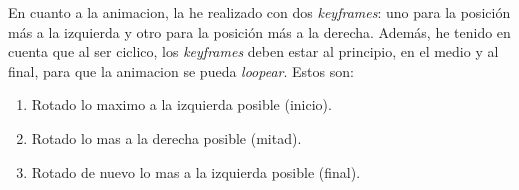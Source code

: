 \documentclass{article}
\begin{document}
En cuanto a la animacion, la he realizado con dos \textit{keyframes}: uno para la posición más a la izquierda y otro para la posición más a la derecha. Además, he tenido en cuenta que al ser ciclico, los \textit{keyframes} deben estar al principio, en el medio y al final, para que la animacion se pueda \textit{loopear}. Estos son:

\begin{enumerate}
    \item Rotado lo maximo a la izquierda posible (inicio).
    \item Rotado lo mas a la derecha posible (mitad).
    \item Rotado de nuevo lo mas a la izquierda posible (final).
\end{enumerate}

\end{document}
